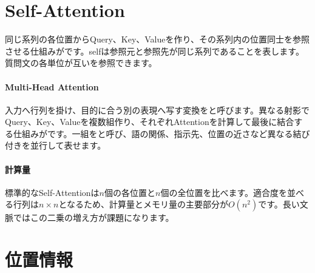 \par
\endgroup


\section{Self-Attention}
\label{sec:06-machine-learning-24}

同じ系列の各位置からQuery、Key、Valueを作り、その系列内の位置同士を参照させる仕組みがです。selfは参照元と参照先が同じ系列であることを表します。質問文の各単位が互いを参照できます。

\begingroup
  \centering
  \vspace{4mm}
\begingroup
\paragraph{Multi-Head Attention}
        入力へ行列を掛け、目的に合う別の表現へ写す変換をと呼びます。異なる射影でQuery、Key、Valueを複数組作り、それぞれAttentionを計算して最後に結合する仕組みがです。一組をと呼び、語の関係、指示先、位置の近さなど異なる結び付きを並行して表せます。

\par
\endgroup
\medskip
\begingroup
\paragraph{計算量}
        標準的なSelf-Attentionは$n$個の各位置と$n$個の全位置を比べます。適合度を並べる行列は$n\times n$となるため、計算量とメモリ量の主要部分が$O(n^2)$です。長い文脈ではこの二乗の増え方が課題になります。

\par
\endgroup
\par
\endgroup


\section{位置情報}
\label{sec:06-machine-learning-25}

